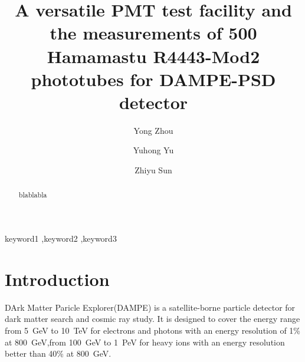 \documentclass[preprint,5p,times]{elsarticle}
\begin{document}
\begin{frontmatter}

\title{A versatile PMT test facility and the measurements of 500 Hamamastu R4443-Mod2 phototubes for DAMPE-PSD detector}

\author[imp,ucas,lzu]{Yong Zhou}

\author[imp]{Yuhong Yu}

\author[imp]{Zhiyu Sun}


\address[imp]{Institute of Modern Physicas,Chinese Academy of Sciences, 509 Nanchang Road, Lanzhou, 730000, P.R.China}
\address[ucas]{Graduate University of the Chinese Academy of Sciences, 19A Yuquan Road, Beijing, 100049, P.R.China}
\address[lzu]{School of Nuclear Science and Technology, Lanzhou University, 222 South Tianshui Road, Lanzhou, 730000, P.R.China}

\begin{abstract}
blablabla
\end{abstract}

\begin{keyword}
keyword1
\sep keyword2
\sep keyword3



\end{keyword}

\end{frontmatter}

\section{Introduction}
\label{sec:introduction}

DArk Matter Paricle Explorer(DAMPE)\cite{Chang_Jin_dampe} is a satellite-borne particle detector for dark matter search and cosmic ray study.
It is designed to cover the energy range from 5~GeV to 10~TeV for electrons and photons with an energy resolution of 1\% at 800~GeV,from 100~GeV to 1~PeV for heavy ions with an energy resolution better than 40\% at 800~GeV.
\end{document}
